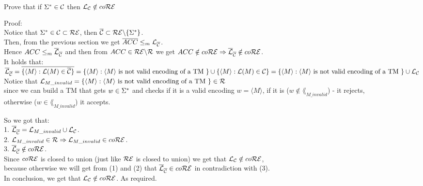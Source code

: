 Prove that if $\Sigma^* \in \mathcal{C}$ then $\mathcal{L}_{\mathcal{C}} \notin co\mathcal{R}\mathcal{E}$

Proof: \\
Notice that $\Sigma^* \in \mathcal{C} \subset \mathcal{R}\mathcal{E}$, then $\overline{\mathcal{C}} \subset \mathcal{R}\mathcal{E} \backslash  \{\Sigma^*\}$. \\
Then, from the previous section we get $\overline{ACC} \leq_m \mathcal{L}_{\overline{\mathcal{C}}}$. \\
Hence $ACC \leq_m \overline{\mathcal{L}}_{\overline{\mathcal{C}}}$ and then from $ACC \in \mathcal{R}\mathcal{E} \backslash \mathcal{R}$ we get $ACC \notin co\mathcal{R}\mathcal{E} \Rightarrow \overline{\mathcal{L}}_{ \overline{\mathcal{C}}} \notin co\mathcal{R}\mathcal{E}$. \\
It holds that: \\
$\overline{\mathcal{L}}_{\overline{\mathcal{C}}} = \overline{\{\langle M \rangle : \mathcal{L}(M) \in \overline{\mathcal{C}}\}} \\
    = \{\langle M \rangle : \langle M \rangle \text{ is not valid encoding of a TM }\} \cup \{\langle M \rangle : \mathcal{L}(M) \in \mathcal{C}\}  \\
    = \{\langle M \rangle : \langle M \rangle \text{ is not valid encoding of a TM }\} \cup \mathcal{L}_{\mathcal{C}}$ \\

Notice that $\mathcal{L}_{M\_invalid} = \{\langle M \rangle : \langle M \rangle \text{ is not valid encoding of a TM }\} \in \mathcal{R}$ \\
since we can build a TM that gets $w \in \Sigma^*$ and checks if it is a valid encoding $w = \langle M \rangle$, if it is ($w \notin \lang_{M\_invalid}$) - it rejects, \\
otherwise ($w \in \lang_{M\_invalid}$) it accepts.

So we got that: \\
1. $\overline{\mathcal{L}}_{\overline{\mathcal{C}}} = \mathcal{L}_{M\_invalid} \cup \mathcal{L}_{\mathcal{C}}$. \\
2. $\mathcal{L}_{M\_invalid} \in \mathcal{R} \Rightarrow \mathcal{L}_{M\_invalid} \in co\mathcal{R}\mathcal{E}$. \\
3. $\overline{\mathcal{L}}_{\overline{\mathcal{C}}} \notin co\mathcal{R}\mathcal{E}$. \\

Since $co\mathcal{R}\mathcal{E}$ is closed to union (just like $\mathcal{R}\mathcal{E}$ is closed to union) we get that $\mathcal{L}_{\mathcal{C}} \notin co\mathcal{R}\mathcal{E}$, \\
because otherwise we will get from (1) and (2) that $\overline{\mathcal{L}}_{\overline{\mathcal{C}}} \in co\mathcal{R}\mathcal{E}$ in contradiction with (3). \\

In conclusion, we get that $\mathcal{L}_{\mathcal{C}} \notin co\mathcal{R}\mathcal{E}$. As required. \\